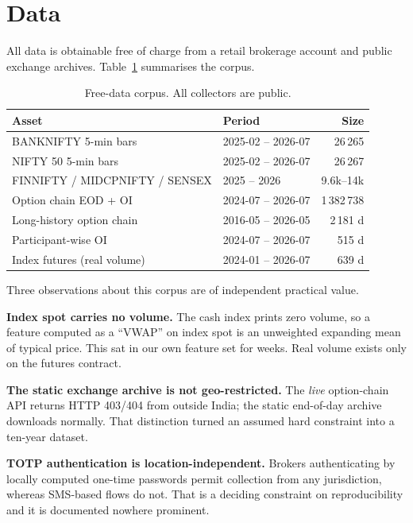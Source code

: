 \documentclass[conference]{IEEEtran}
\begin{document}
\section{Data}
\label{sec:data}

All data is obtainable free of charge from a retail brokerage account and public
exchange archives. Table~\ref{tab:data} summarises the corpus.

\begin{table}[!tb]
\caption{Free-data corpus. All collectors are public.}
\label{tab:data}
\centering
\scriptsize
\setlength{\tabcolsep}{3pt}
\begin{tabular}{@{}llr@{}}
\toprule
\textbf{Asset} & \textbf{Period} & \textbf{Size} \\
\midrule
BANKNIFTY 5-min bars & 2025-02 -- 2026-07 & 26\,265 \\
NIFTY 50 5-min bars & 2025-02 -- 2026-07 & 26\,267 \\
FINNIFTY / MIDCPNIFTY / SENSEX & 2025 -- 2026 & 9.6k--14k \\
Option chain EOD + OI & 2024-07 -- 2026-07 & 1\,382\,738 \\
Long-history option chain & 2016-05 -- 2026-05 & 2\,181 d \\
Participant-wise OI & 2024-07 -- 2026-07 & 515 d \\
Index futures (real volume) & 2024-01 -- 2026-07 & 639 d \\
\bottomrule
\end{tabular}
\end{table}

Three observations about this corpus are of independent practical value.

\textbf{Index spot carries no volume.} The cash index prints zero volume, so a
feature computed as a ``VWAP'' on index spot is an unweighted expanding mean of
typical price. This sat in our own feature set for weeks. Real volume exists
only on the futures contract.

\textbf{The static exchange archive is not geo-restricted.} The \emph{live}
option-chain API returns HTTP 403/404 from outside India; the static end-of-day
archive downloads normally. That distinction turned an assumed hard constraint
into a ten-year dataset.

\textbf{TOTP authentication is location-independent.} Brokers authenticating by
locally computed one-time passwords permit collection from any jurisdiction,
whereas SMS-based flows do not. That is a deciding constraint on
reproducibility and it is documented nowhere prominent.
\end{document}
